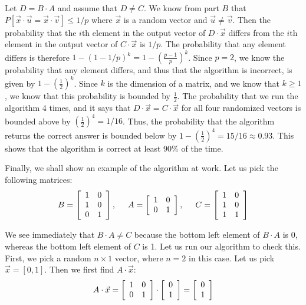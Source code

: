 \documentclass[psamsfonts]{amsart}
\newenvironment{sol}{{\bfseries Solution}}{\qedsymbol}
\theoremstyle{definition}
\theoremstyle{remark}
\numberwithin{equation}{section}
\begin{document}
\begin{sol}
Let $D = B \cdot A$ and assume that $D \neq C$. We know from part $B$ that $P[ \vec{x} \cdot \vec{u} = \vec{x} \cdot \vec{v}] \leq 1/p$ where $\vec{x}$ is a random vector and $\vec{u} \neq \vec{v}$. Then the probability that the $i$th element in the output vector of $D \cdot \vec{x}$ differs from the $i$th element in the output vector of $C \cdot \vec{x}$ is $1/p$. The probability that any element differs is therefore $1 - (1 - 1/p)^k = 1 - (\frac{p-1}{p})^k$.  Since $p = 2$, we know the probability that any element differs, and thus that the algorithm is incorrect, is given by $1 - (\frac{1}{2})^k$. Since $k$ is the dimension of a matrix, and we know that $k \geq 1$, we know that this probability is bounded by $\frac{1}{2}$. The probability that we run the algorithm 4 times, and it says that $D \cdot \vec{x} = C \cdot \vec{x}$ for all four randomized vectors is bounded above by $(\frac{1}{2})^4 = 1 /16$. Thus, the probability that the algorithm returns the correct answer is bounded below by $1 - (\frac{1}{2})^4 = 15/16 \approx 0.93$. This shows that the algorithm is correct at least 90\% of the time.

Finally, we shall show an example of the algorithm at work. Let us pick the following matrices:
\begin{equation}
B = \left[ \begin{array}{c c}
1 & 0 \\
1 & 0 \\
0 & 1 
\end{array} \right], 
\hspace{0.5cm} A = \left[ \begin{array}{c c c}
1 & 0 \\
0 & 1 \\
\end{array} \right], 
\hspace{0.5cm} C = \left[ \begin{array}{c c}
1 & 0 \\
1 & 0 \\
1 & 1 
\end{array} \right]
\end{equation} 

We see immediately that $B \cdot A \neq C$ because the bottom left element of $B \cdot A$ is $0$, whereas the bottom left element of $C$ is 1. Let us run our algorithm to check this. First, we pick a random $n \times 1$ vector, where $n = 2$ in this case. Let us pick $\vec{x} = [0, 1]$. Then we first find $A \cdot \vec{x}$:
\begin{equation}
A \cdot \vec{x} = \left[ \begin{array}{c c c}
1 & 0 \\
0 & 1 \\
\end{array} \right] \cdot 
\left[ \begin{array}{c}
0 \\
1 
\end{array} \right] = 
\left[ \begin{array}{c}
0 \\
1 
\end{array} \right]
\end{equation}


\end{sol}
\end{document}
